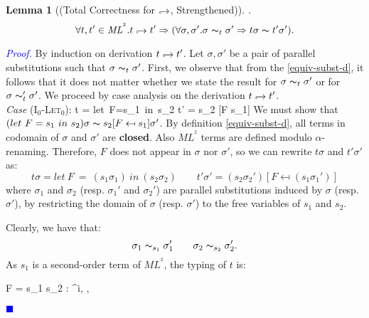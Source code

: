 \documentclass[a4paper,11pt,oneside]{article}
\theoremstyle{plain}
\newtheorem{lemma}[definition]{Lemma}
\renewenvironment{proof}{\noindent \begin{adjustwidth}{1.5em}{} \textcolor{blue}{\textit{Proof.}}}
{{\begin{tiny}\textcolor{blue}{$\blacksquare$}\end{tiny}}
\end{adjustwidth}~\\\noindent}
\newcommand{\tmlet}[3]{let~#1=#2~in~#3}
\newcommand{\tmsbst}[3]{#1 [#2 \mapsfrom #3] }
\newcommand{\bth}{\bot_\theta}
\newcommand{\brh}{\bot_\rho}
\newcommand{\inlsrc}{\textit{ML}^{^2}}
\newcommand{\hookdownarrow}{\mathrel{\rotatebox[origin=c]{180}{$\hookleftarrow$}}}
\newcommand{\ilarr}{\hookdownarrow}
\newcommand{\il}[2]{#1 \ilarr #2}
\begin{document}
\begin{lemma}[(Total Correctness for $\ilarr$, Strengthened)]
	\label{equiv-total-corr-p}.
   $$ \forall t,t' \in \inlsrc. \il{t}{t'} \Rightarrow (\forall \sigma, \sigma'. \sigma \thicksim_t \sigma' \Rightarrow t\sigma \thicksim t'\sigma').$$
  \end{lemma}
	\begin{proof}
	 By induction on derivation $\il{t}{t'}$. 
	 Let $\sigma, \sigma'$ be a pair of parallel substitutions such that $\sigma \thicksim_t \sigma'$.
	 First, we observe that from the \cref{equiv-subst-d}, it follows that it does not matter whether we state the result for $\sigma \thicksim_t \sigma'$ or for $\sigma \thicksim_t' \sigma'$.
	 We proceed by case analysis on the derivation $\il{t}{t'}$.\\
	 
	\noindent\textit{Case} (\textsc{I}$_{0}$-\textsc{Let}$_0$):
	\vspace*{-1cm}
			{t = \tmlet{F}{s_1}{s_2} \hookdownarrow 				
			t' = \tmsbst{s_2}{F}{s_1}}
	 We must show that $(\tmlet{F}{s_1}{s_2})\sigma \thicksim \tmsbst{s_2}{F}{s_1}\sigma'$. 
By definition \cref{equiv-subst-d}, all terms in codomain of $\sigma$ and $\sigma'$ are \textbf{closed}. Also $\inlsrc$ terms are defined modulo $\alpha$-renaming. Therefore, $F$ does not appear in $\sigma$ nor $\sigma'$, so we can rewrite $t\sigma$ and $t'\sigma'$ as: 
	 $$ t\sigma = let~F~=~(s_1\sigma_1)~in~(s_2\sigma_2) \qquad
	 t'\sigma' = (s_2\sigma_2')[F \mapsfrom (s_1 \sigma_1')]$$ 	 
where $\sigma_1$ and $\sigma_2$ (resp. $\sigma_1'$ and $\sigma_2'$) are parallel substitutions induced by $\sigma$ (resp. $\sigma'$), by restricting the domain of $\sigma$ (resp. $\sigma'$) to the free variables of $s_1$ and $s_2$.

	Clearly, we have that:
$$ \sigma_1 \thicksim_{s_1} \sigma_1' \qquad \sigma_2 \thicksim_{s_2} \sigma_2'.$$
	As $s_1$ is a second-order term of $\inlsrc$, the typing of $t$ is:
		\begin{footnotesize}
		\infrule[] 
			{\vdash s_1 : \tau^2, \bth, \brh
			\qquad \vdash s_2 : \tau^i, \theta, \rho \quad (i \in \{0,1\})} 
			{\vdash {} F = s_1  s_2 
				: \tau^{i}, 
				\theta, 
				\rho}
	\end{footnotesize} 
	 

\end{proof}
\end{document}
